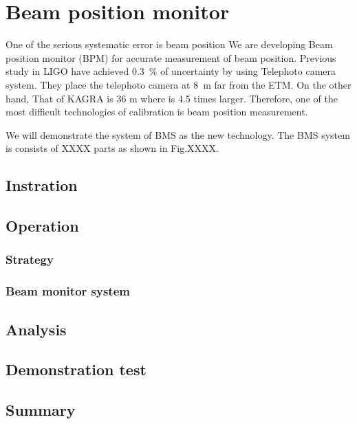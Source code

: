 
\chapter{Beam position monitor} %

\label{Chapter6} %
One of the serious systematic error is beam position
We are developing Beam position monitor (BPM) for accurate measurement of beam position.
Previous study in LIGO have achieved 0.3~\% of uncertainty by using Telephoto camera system.
They place the telephoto camera at 8~m far from the ETM. On the other hand, That of KAGRA is 36 m where is 4.5 times larger. Therefore, one of the most difficult technologies of calibration is beam position measurement.

We will demonstrate the system of BMS as  the new technology. The BMS system is consists of XXXX parts as shown in Fig.XXXX.
\section{Instration}
\section{Operation}
\subsection{Strategy}
\subsection{Beam monitor system}
\section{Analysis}
\section{Demonstration test}
\section{Summary}

 